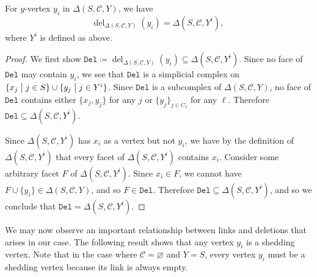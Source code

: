 \documentclass[ALCO,published]{cedram}
\numberwithin{equation}{section}
\newcommand{\st}{\bigm\vert}
\newcommand{\sC}{\mathscr{C}}
\newcommand{\D}{\mathtt{Del}}
\renewcommand{\emptyset}{\varnothing}
\DeclareMathOperator{\del}{\mathrm{del}}
\newcommand{\1}{^{-1}}
\begin{document}
\begin{prop}\label{del}
For $y$-vertex $y_i$ in $\Delta(S,\sC,Y)$, we have
\[
\del_{\Delta(S,\sC,Y)}(y_i) = \Delta(S,\sC,Y^i), \
\]
where $Y^i$ is defined as above.
\end{prop}
\begin{proof}
We first show $\D \coloneqq \del_{\Delta(S,\sC,Y)}(y_i) \subseteq
\Delta(S,\sC,Y^i)$. Since no face of $\D$ may contain $y_i$, we see
that $\D$ is a simplicial complex on $\{x_j \st j \in S\} \cup \{y_j
\st j \in Y^i\}$. Since $\D$ is a subcomplex of $\Delta(S,\sC,Y)$, no
face of $\D$ contains either $\{x_j,y_j\}$ for any $j$ or $\{y_j\}_{j
  \in C_\ell}$ for any $\ell$. Therefore $\D \subseteq
\Delta(S,\sC,Y^i)$.

 Since $\Delta(S,\sC,Y^i)$ has $x_i$ as a vertex but not $y_i$, we have by the definition of $\Delta(S,\sC,Y^i)$ that every facet of $\Delta(S,\sC,Y^i)$ contains $x_i$. Consider some arbitrary facet $F$ of $\Delta(S,\sC,Y^i)$. Since $x_i \in F$, we cannot have $F \cup \{y_i\} \in \Delta(S,\sC,Y)$, and so $F \in \D$. Therefore $\D \subseteq \Delta(S,\sC,Y^i)$, and so we conclude that $\D = \Delta(S,\sC,Y^i)$.
\end{proof}
We may now observe an important relationship between links and deletions that arises in our case. The following result shows that any vertex $y_i$ is a shedding vertex. Note that in the case where $\sC = \emptyset$ and $Y=S$, every vertex $y_i$ must be a shedding vertex because its link is always empty.
\end{document}
